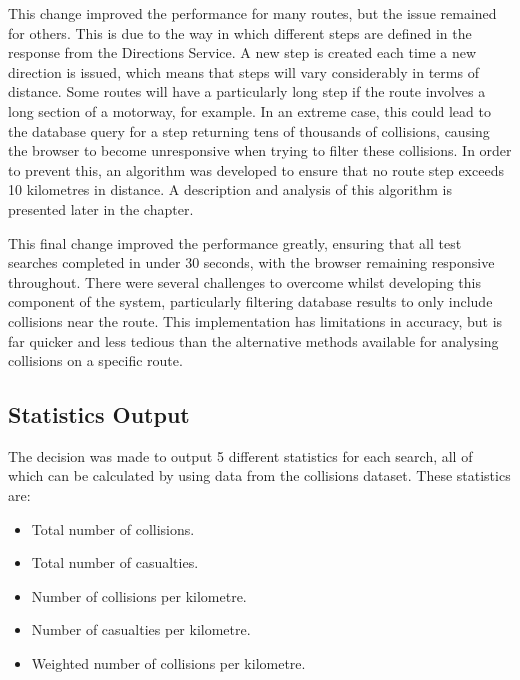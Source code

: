 \documentclass[authoryearcitations]{UoYCSproject}
\begin{document}
This change improved the performance for many routes, but the issue remained for others. This is due to the way in which different steps are defined in the response from the Directions Service. A new step is created each time a new direction is issued, which means that steps will vary considerably in terms of distance. Some routes will have a particularly long step if the route involves a long section of a motorway, for example. In an extreme case, this could lead to the database query for a step returning tens of thousands of collisions, causing the browser to become unresponsive when trying to filter these collisions. In order to prevent this, an algorithm was developed to ensure that no route step exceeds 10 kilometres in distance. A description and analysis of this algorithm is presented later in the chapter. 

This final change improved the performance greatly, ensuring that all test searches completed in under 30 seconds, with the browser remaining responsive throughout. There were several challenges to overcome whilst developing this component of the system, particularly filtering database results to only include collisions near the route. This implementation has limitations in accuracy, but is far quicker and less tedious than the alternative methods available for analysing collisions on a specific route.

\subsection{Statistics Output}

The decision was made to output 5 different statistics for each search, all of which can be calculated by using data from the collisions dataset. These statistics are:

\begin{itemize}
	\item Total number of collisions.
	\item Total number of casualties.
	\item Number of collisions per kilometre.
	\item Number of casualties per kilometre.
	\item Weighted number of collisions per kilometre.
\end{itemize}
\end{document}
